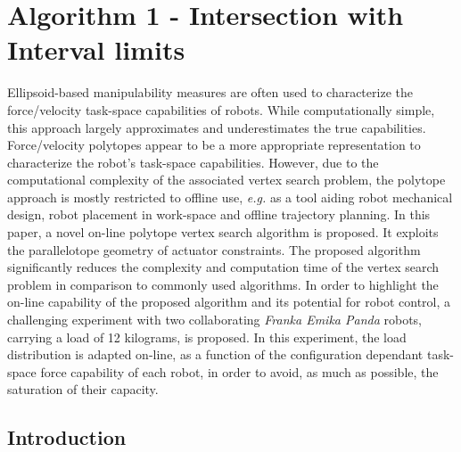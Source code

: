 

\newcommand{\onum}[1]{\overline{{#1}}} 	%
\newcommand{\unum}[1]{\underline{{#1}}}  	%

\chapter{Algorithm 1 - Intersection with Interval limits}

Ellipsoid-based manipulability measures are often used to characterize the force/velocity task-space capabilities of robots. While computationally simple, this approach largely approximates and underestimates the true capabilities. Force/velocity polytopes appear to be a more appropriate representation to characterize the robot's task-space capabilities. However, due to the computational complexity of the associated vertex search problem, the polytope approach is mostly restricted to  offline use, \textit{e.g.} as a tool aiding robot mechanical design, robot placement in work-space and offline trajectory planning. In this paper, a novel on-line polytope vertex search algorithm is proposed. It exploits the parallelotope geometry of actuator constraints. The proposed algorithm significantly reduces the complexity and computation time of the vertex search problem in comparison to commonly used algorithms. In order to highlight the on-line capability of the proposed algorithm and its potential for robot control, a challenging experiment with two collaborating \textit{Franka Emika Panda} robots, carrying a load of 12 kilograms, is proposed. In this experiment, the load distribution is adapted on-line, as a function of the configuration dependant task-space force capability of each robot, in order to avoid, as much as possible, the saturation of their capacity.


\section{Introduction}

